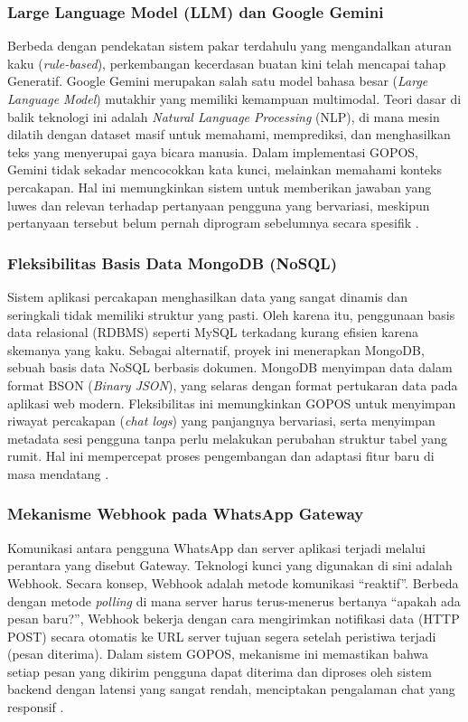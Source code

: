 \subsubsection{Large Language Model (LLM) dan Google Gemini}

Berbeda dengan pendekatan sistem pakar terdahulu yang mengandalkan aturan kaku (\textit{rule-based}), perkembangan kecerdasan buatan kini telah mencapai tahap Generatif. Google Gemini merupakan salah satu model bahasa besar (\textit{Large Language Model}) mutakhir yang memiliki kemampuan multimodal. Teori dasar di balik teknologi ini adalah \textit{Natural Language Processing} (NLP), di mana mesin dilatih dengan dataset masif untuk memahami, memprediksi, dan menghasilkan teks yang menyerupai gaya bicara manusia. Dalam implementasi GOPOS, Gemini tidak sekadar mencocokkan kata kunci, melainkan memahami konteks percakapan. Hal ini memungkinkan sistem untuk memberikan jawaban yang luwes dan relevan terhadap pertanyaan pengguna yang bervariasi, meskipun pertanyaan tersebut belum pernah diprogram sebelumnya secara spesifik \parencite{rachmat2024}.

\subsubsection{Fleksibilitas Basis Data MongoDB (NoSQL)}

Sistem aplikasi percakapan menghasilkan data yang sangat dinamis dan seringkali tidak memiliki struktur yang pasti. Oleh karena itu, penggunaan basis data relasional (RDBMS) seperti MySQL terkadang kurang efisien karena skemanya yang kaku. Sebagai alternatif, proyek ini menerapkan MongoDB, sebuah basis data NoSQL berbasis dokumen. MongoDB menyimpan data dalam format BSON (\textit{Binary JSON}), yang selaras dengan format pertukaran data pada aplikasi web modern. Fleksibilitas ini memungkinkan GOPOS untuk menyimpan riwayat percakapan (\textit{chat logs}) yang panjangnya bervariasi, serta menyimpan metadata sesi pengguna tanpa perlu melakukan perubahan struktur tabel yang rumit. Hal ini mempercepat proses pengembangan dan adaptasi fitur baru di masa mendatang \parencite{barman2025}.

\subsubsection{Mekanisme Webhook pada WhatsApp Gateway}

Komunikasi antara pengguna WhatsApp dan server aplikasi terjadi melalui perantara yang disebut Gateway. Teknologi kunci yang digunakan di sini adalah Webhook. Secara konsep, Webhook adalah metode komunikasi ``reaktif''. Berbeda dengan metode \textit{polling} di mana server harus terus-menerus bertanya ``apakah ada pesan baru?'', Webhook bekerja dengan cara mengirimkan notifikasi data (HTTP POST) secara otomatis ke URL server tujuan segera setelah peristiwa terjadi (pesan diterima). Dalam sistem GOPOS, mekanisme ini memastikan bahwa setiap pesan yang dikirim pengguna dapat diterima dan diproses oleh sistem backend dengan latensi yang sangat rendah, menciptakan pengalaman chat yang responsif \parencite{aidyn2024}.

